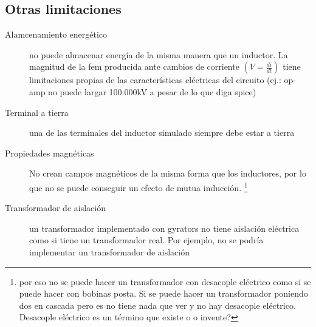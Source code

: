 \subsection{Otras limitaciones}

\begin{description}	
	\item[Alamcenamiento energ\'etico] no puede almacenar energ\'ia de la misma manera que un inductor. La magnitud de la fem producida ante cambios de corriente $\left( V = \frac{di}{dt} \right) $ tiene limitaciones propias de las caracter\'isticas el\'ectricas del circuito (ej.: op-amp no puede largar 100.000kV a pesar de lo que diga spice) 
	\item[Terminal a tierra] una de las terminales del inductor simulado siempre debe estar a tierra 
	
	\item[Propiedades magn\'eticas] No crean campos magn\'eticos de la misma forma que los inductores, por lo que no se puede conseguir un efecto de mutua inducci\'on. \footnote{por eso no se puede hacer un transformador con desacople el\'ectrico como si se puede hacer con bobinas posta. Si se puede hacer un transformador poniendo dos en cascada pero es no tiene nada que ver y no hay desacople el\'ectrico. Desacople el\'ectrico es un t\'ermino que existe o o invente?}
	
	\item[Transformador de aislaci\'on] un transformador implementado con gyrators no tiene aislaci\'on el\'ectrica como si tiene un transformador real. Por ejemplo, no se podr\'ia implementar un transformador de aislaci\'on 

\end{description}


